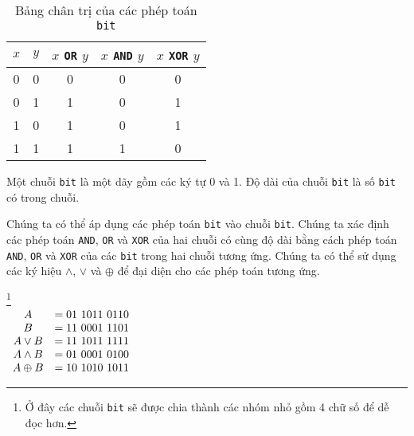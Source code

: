 \documentclass{standalone} %
\begin{document}
        \begin{table}[h!]
            \centering
            \setlength{\tabcolsep}{19pt}
            \begin{tabular}{c c c c c}
                $x$ & $y$ & $x$ \texttt{OR} $y$ & $x$ \texttt{AND} $y$ & $x$ \texttt{XOR} $y$\\ \hline
                0 & 0 & 0 & 0 & 0\\ 
                0 & 1 & 1 & 0 & 1\\
                1 & 0 & 1 & 0 & 1\\
                1 & 1 & 1 & 1 & 0
            \end{tabular}
            \caption{Bảng chân trị của các phép toán \texttt{bit}}
        \end{table}
        
        \begin{definition}
            Một chuỗi \texttt{bit} là một dãy gồm các ký tự 0 và 1. Độ dài của chuỗi \texttt{bit} là số \texttt{bit} có trong chuỗi.
        \end{definition}
        
        Chúng ta có thể áp dụng các phép toán \texttt{bit} vào chuỗi \texttt{bit}. Chúng ta xác định các phép toán \texttt{AND}, \texttt{OR} và \texttt{XOR} của hai chuỗi có cùng độ dài bằng cách phép toán \texttt{AND}, \texttt{OR} và \texttt{XOR} của các \texttt{bit} trong hai chuỗi tương ứng. Chúng ta có thể sử dụng các ký hiệu $\land$, $\lor$ và $\oplus$ để đại diện cho các phép toán tương ứng.
        
        \begin{example}\footnote{
                Ở đây các chuỗi \texttt{bit} sẽ được chia thành các nhóm nhỏ gồm 4 chữ số để dễ đọc hơn.
                }\ \\
            $\begin{array}{c l}
                A &= 01\ 1011\ 0110\\
                B &= 11\ 0001\ 1101\\
                A \lor B &= 11\ 1011\ 1111\\
                A \land B &= 01\ 0001\ 0100\\
                A \oplus B &= 10\ 1010\ 1011
            \end{array}$
        \end{example}

\end{document}
